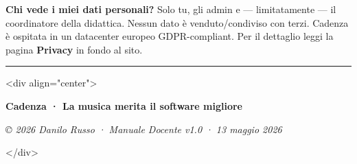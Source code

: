 \documentclass[11pt,a4paper]{article}
\begin{document}
\textbf{Chi vede i miei dati personali?} Solo tu, gli admin e --- limitatamente --- il coordinatore della didattica. Nessun dato è venduto/condiviso con terzi. Cadenza è ospitata in un datacenter europeo GDPR-compliant. Per il dettaglio leggi la pagina \textbf{Privacy} in fondo al sito.

\medskip\hrule\medskip

\textless{}div align="center"\textgreater{}

\textbf{Cadenza · La musica merita il software migliore}

\textit{© 2026 Danilo Russo · Manuale Docente v1.0 · 13 maggio 2026}

\textless{}/div\textgreater{}
\end{document}
